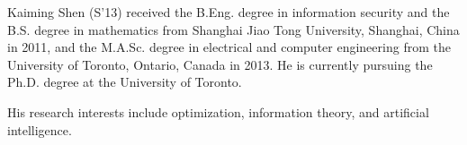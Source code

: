 \documentclass[journal,12pt,onecolumn,draftclsnofoot,]{IEEEtran}
\begin{document}
\begin{IEEEbiography}
{Kaiming Shen}
(S'13) received the B.Eng. degree in information security and the B.S. degree in mathematics from Shanghai Jiao Tong University, Shanghai, China in 2011, and the M.A.Sc. degree in electrical and computer engineering from the University of Toronto, Ontario, Canada in 2013. He is currently pursuing the Ph.D. degree at the University of Toronto.

His research interests include optimization, information theory, and artificial intelligence.
\end{IEEEbiography}
\end{document}
